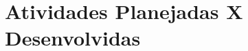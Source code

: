 

\section{Atividades Planejadas X Desenvolvidas}
    \label{sec:atividades-planejadas-desenvolvidas}